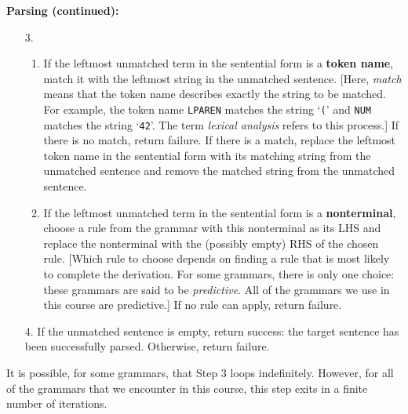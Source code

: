 \begin{minipage}[t]{\sw}
\slidenumber
\LARGE
{\bf Parsing (continued):}
\begin{enumerate}
\itemsep -0.5ex
\item [3.]
  \begin{enumerate}
  \item
    If the leftmost unmatched term in the sentential form is a {\bf token name},
    match it with the leftmost string in the unmatched sentence.
    [Here, {\em match} means that the token name describes exactly
    the string to be matched.
    For example, the token name {\tt LPAREN} matches the string `\verb'(''
    and {\tt NUM} matches the string `\verb'42''.
    The term {\em lexical analysis} refers to this process.]
    If there is no match, return failure.
    If there is a match, replace the leftmost token name in the
    sentential form with its matching string from the unmatched sentence
    and remove the matched string from the unmatched sentence.
  \item
    If the leftmost unmatched term
    in the sentential form is a {\bf nonterminal},
    choose a rule from the grammar with this nonterminal as its LHS
    and replace the nonterminal with the (possibly empty) RHS
    of the chosen rule.
    [Which rule to choose depends on
    finding a rule that is most likely to complete the derivation.
    For some grammars, there is only one choice: these grammars
    are said to be {\em predictive}.  All of the grammars we
    use in this course are predictive.]
    If no rule can apply, return failure.
  \end{enumerate}
\item [4.]
  If the unmatched sentence is empty, return success:
  the target sentence has been successfully parsed.
  Otherwise, return failure.
\end{enumerate}
It is possible, for some grammars, that Step 3 loops indefinitely.
However, for all of the grammars that we encounter in this course,
this step exits in a finite number of iterations.
\end{minipage}
\clearpage
